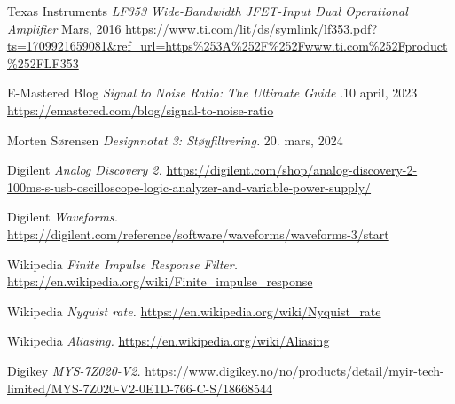     Texas Instruments
    \emph{LF353 Wide-Bandwidth JFET-Input Dual Operational Amplifier}
    Mars, 2016
    \url{https://www.ti.com/lit/ds/symlink/lf353.pdf?ts=1709921659081&ref_url=https\%253A\%252F\%252Fwww.ti.com\%252Fproduct\%252FLF353}

    E-Mastered Blog
    \emph{ Signal to Noise Ratio: The Ultimate Guide}
    .10 april, 2023
    \url{https://emastered.com/blog/signal-to-noise-ratio}

    Morten Sørensen
    \emph{Designnotat 3: Støyfiltrering.}
    20. mars, 2024

    Digilent
    \emph{Analog Discovery 2.}
    \newline
    \url{https://digilent.com/shop/analog-discovery-2-100ms-s-usb-oscilloscope-logic-analyzer-and-variable-power-supply/}
    
    Digilent
    \emph{Waveforms.}
    \newline
    \url{https://digilent.com/reference/software/waveforms/waveforms-3/start}

    Wikipedia
    \emph{Finite Impulse Response Filter.}
    \url{https://en.wikipedia.org/wiki/Finite_impulse_response}

    Wikipedia
    \emph{Nyquist rate.}
    \url{https://en.wikipedia.org/wiki/Nyquist_rate}

    Wikipedia
    \emph{Aliasing.}
    \url{https://en.wikipedia.org/wiki/Aliasing}

    Digikey
    \emph{MYS-7Z020-V2.}
    \url{https://www.digikey.no/no/products/detail/myir-tech-limited/MYS-7Z020-V2-0E1D-766-C-S/18668544}
